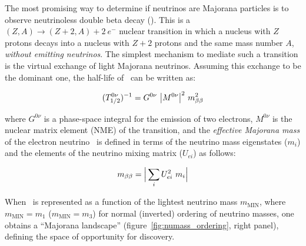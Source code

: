 
The most promising way to determine if neutrinos are Majorana particles is to observe neutrinoless double beta decay (\bbonu). This is a $(Z,A) \rightarrow (Z+2,A) + 2\ e^{-}$ nuclear transition in which a nucleus with $Z$ protons decays into a nucleus with $Z+2$ protons and the same mass number $A$, {\em without emitting neutrinos}. The simplest mechanism to mediate such a transition is the virtual exchange of light Majorana neutrinos. Assuming this exchange to be the  dominant one, the half-life of \bbonu\ can be written as:

\begin{equation}
(T^{0\nu}_{1/2})^{-1} = G^{0\nu} \ \big|M^{0\nu}\big|^{2} \ \mbb^{2}
\label{eq:halflife}
\end{equation}

\noindent where $G^{0\nu}$ is a phase-space integral for the emission of two electrons, $M^{0\nu}$ is the nuclear matrix element (NME) of the transition, and the \emph{effective Majorana mass} of the electron neutrino \mbb\ is defined in terms of the neutrino mass eigenstates ($m_{i}$) and the elements of the neutrino mixing matrix ($U_{ei}$) as follows:

\begin{equation}
m_{\beta\beta} = \Big| \sum_{i} U^{2}_{ei} \ m_{i} \Big|
\label{eq:mbb}
\end{equation}



When \mbb\ is represented as a function of the lightest neutrino mass $m_\mathrm{MIN}$, where $m_\mathrm{MIN}=m_1$ ($m_\mathrm{MIN}=m_3$) for normal (inverted) ordering of neutrino masses, one obtains a ``Majorana landscape'' (figure~\ref{fig:numass_ordering}, right panel), defining the space of opportunity for discovery.


